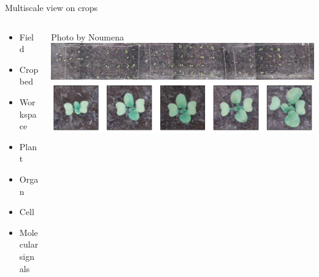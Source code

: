 \begin{frame}{Multiscale view on crops}

\begin{columns}
\begin{column}{0.35\textwidth}

\begin{itemize}
\item Field
\item \alert{Crop bed}
\item \alert{Workspace}
\item {\color{romi} Plant}
\item \alert{Organ}
\item Cell
\item Molecular signals
\end{itemize}

\end{column}
\begin{column}{0.65\textwidth}
\hfill {\tiny \color{black!40}Photo by Noumena}
\\
\includegraphics[width=\linewidth]{pics/cropbed.png}\\
\includegraphics[width=\linewidth]{pics/growth.png}\\
\end{column}
\end{columns}

\end{frame}


